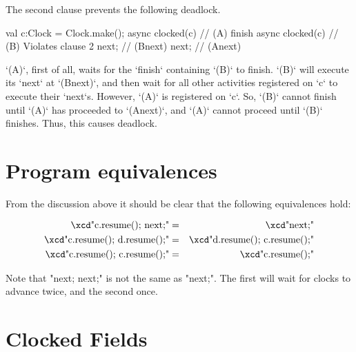 The second clause prevents the following deadlock.  
\begin{xten}
val c:Clock = Clock.make();
async clocked(c) {                // (A) 
      finish async clocked(c) {   // (B) Violates clause 2
            next;                 // (Bnext)
      }
      next;                       // (Anext)
}
\end{xten}
\xcd`(A)`, first of all, waits for the \xcd`finish` containing \xcd`(B)` to
finish.  
\xcd`(B)` will execute its \xcd`next` at \xcd`(Bnext)`, and then wait for all
other activities registered on \xcd`c` to execute their \xcd`next`s.
However, \xcd`(A)` is registered on \xcd`c`.  So, \xcd`(B)` cannot finish
until \xcd`(A)` has proceeded to \xcd`(Anext)`, and \xcd`(A)` cannot proceed
until \xcd`(B)` finishes. Thus, this causes deadlock.


\section{Program equivalences}
From the discussion above it should be clear that the following
equivalences hold:

\begin{eqnarray}
 \mbox{\xcd"c.resume(); next;"}       &=& \mbox{\xcd"next;"}\\
 \mbox{\xcd"c.resume(); d.resume();"} &=& \mbox{\xcd"d.resume(); c.resume();"}\\
 \mbox{\xcd"c.resume(); c.resume();"} &=& \mbox{\xcd"c.resume();"}
\end{eqnarray}

Note that \xcd"next; next;" is not the same as \xcd"next;". The
first will wait for clocks to advance twice, and the second
once.  


\section{Clocked Fields}
\label{ClockedFields}
